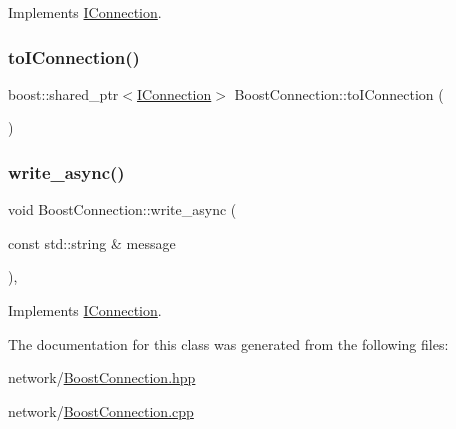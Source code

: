 Implements \mbox{\hyperlink{classIConnection_ae15b6922f3a31a7f316a6390eb2469b2}{I\+Connection}}.

\mbox{\label{classBoostConnection_a3262569e07575555bff604a7f9f6c803}} 
\subsubsection{\texorpdfstring{to\+I\+Connection()}{toIConnection()}}
{\footnotesize\ttfamily boost\+::shared\+\_\+ptr$<$\mbox{\hyperlink{classIConnection}{I\+Connection}}$>$ Boost\+Connection\+::to\+I\+Connection (\begin{DoxyParamCaption}{ }\end{DoxyParamCaption})\hspace{0.3cm}{\ttfamily [inline]}}

\mbox{\label{classBoostConnection_abe7200e60f8b4d909a057f85ca9569db}} 
\subsubsection{\texorpdfstring{write\+\_\+async()}{write\_async()}}
{\footnotesize\ttfamily void Boost\+Connection\+::write\+\_\+async (\begin{DoxyParamCaption}\item[{const std\+::string \&}]{message }\end{DoxyParamCaption})\hspace{0.3cm}{\ttfamily [override]}, {\ttfamily [virtual]}}



Implements \mbox{\hyperlink{classIConnection_a7210f770ebae6277e98142a8b5a6226f}{I\+Connection}}.



The documentation for this class was generated from the following files\+:\begin{DoxyCompactItemize}
\item 
network/\mbox{\hyperlink{BoostConnection_8hpp}{Boost\+Connection.\+hpp}}\item 
network/\mbox{\hyperlink{BoostConnection_8cpp}{Boost\+Connection.\+cpp}}\end{DoxyCompactItemize}
